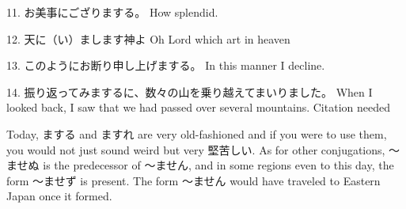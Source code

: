 \par{11. お美事にござりまする。 \hfill\break
How splendid. }

\par{12. 天に（い）まします神よ \hfill\break
Oh Lord which art in heaven }

\par{13. このようにお断り申し上げまする。 \hfill\break
In this manner I decline. }

\par{14. 振り返ってみまするに、数々の山を乗り越えてまいりました。 \hfill\break
When I looked back, I saw that we had passed over several mountains. \hfill\break
Citation needed }

\par{ Today, まする and ますれ are very old-fashioned and if you were to use them, you would not just sound weird but very 堅苦しい. As for other conjugations, ～ませぬ is the predecessor of ～ません, and in some regions even to this day, the form ～ませず is present. The form ～ません would have traveled to Eastern Japan once it formed. }
     